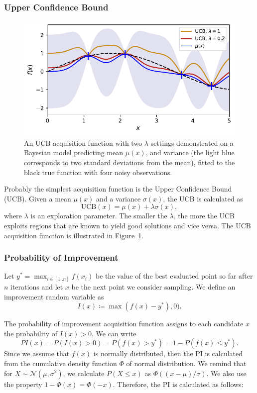 \subsubsection{Upper Confidence Bound}

\begin{figure}
    \centering
    \includegraphics[scale=0.8]{img/ucb_example.pdf}
    \caption{An UCB acquisition function with two $\lambda$ settings demonstrated on a Bayesian model predicting mean $\mu(x)$, and variance (the light blue corresponds to two standard deviations from the mean), fitted to the black true function with four noisy observations.}
    \label{fig:ucb}
\end{figure}

Probably the simplest acquisition function is the Upper Confidence Bound (UCB). Given a mean $\mu(x)$ and a variance $\sigma(x)$, the UCB is calculated as
\[
    \text{UCB}(x) = \mu(x) + \lambda \sigma(x),
\]
where $\lambda$ is an exploration parameter. The smaller the $\lambda$, the more the UCB exploits regions that are known to yield good solutions and vice versa. The UCB acquisition function is illustrated in Figure~\ref{fig:ucb}.

\subsubsection{Probability of Improvement}
Let $y^*=\max_{i\in[1..n]} f(x_i)$ be the value of the best evaluated point so far after $n$ iterations and let $x$ be the next point we consider sampling. We define an improvement random variable as
\[
    I(x) \coloneq \max(f(x) - y^*),0).
\]

The probability of improvement acquisition function assigns to each candidate $x$ the probability of $I(x) > 0$. We can write
\[
    PI(x) = P(I(x) > 0) = P(f(x) > y^*) = 1-P(f(x) \leq y^*).
\]
Since we assume that $f(x)$ is normally distributed, then the PI is calculated from the cumulative density function $\Phi$ of normal distribution. We remind that for $X \sim \mathcal{N}(\mu,\sigma^2)$, we calculate $P(X \leq x)$ as $\Phi ((x-\mu)/\sigma )$. We also use the property $1-\Phi(x)=\Phi(-x)$. Therefore, the PI is calculated as follows:

